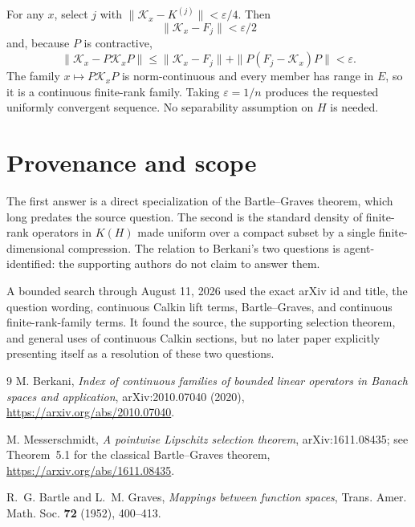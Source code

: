 \documentclass[11pt]{article}
\begin{document}
For any $x$, select $j$ with
$\|\mathcal K_x-K^{(j)}\|<\varepsilon/4$.  Then
\[
 \|\mathcal K_x-F_j\|<\varepsilon/2
\]
and, because $P$ is contractive,
\[
 \|\mathcal K_x-P\mathcal K_xP\|
 \leq \|\mathcal K_x-F_j\|+
       \|P(F_j-\mathcal K_x)P\|
 <\varepsilon.
\]
The family $x\mapsto P\mathcal K_xP$ is norm-continuous and every member has
range in $E$, so it is a continuous finite-rank family.  Taking
$\varepsilon=1/n$ produces the requested uniformly convergent sequence.  No
separability assumption on $H$ is needed.

\section*{Provenance and scope}
The first answer is a direct specialization of the Bartle--Graves theorem,
which long predates the source question.  The second is the standard density
of finite-rank operators in $K(H)$ made uniform over a compact subset by a
single finite-dimensional compression.  The relation to Berkani's two
questions is agent-identified: the supporting authors do not claim to answer
them.

A bounded search through August 11, 2026 used the exact arXiv id and title,
the question wording, continuous Calkin lift terms, Bartle--Graves, and
continuous finite-rank-family terms.  It found the source, the supporting
selection theorem, and general uses of continuous Calkin sections, but no
later paper explicitly presenting itself as a resolution of these two
questions.

\begin{thebibliography}{9}
M. Berkani,
\emph{Index of continuous families of bounded linear operators in Banach spaces and application},
arXiv:2010.07040 (2020),
\url{https://arxiv.org/abs/2010.07040}.

M. Messerschmidt,
\emph{A pointwise Lipschitz selection theorem},
arXiv:1611.08435; see Theorem~5.1 for the classical Bartle--Graves theorem,
\url{https://arxiv.org/abs/1611.08435}.

R.~G. Bartle and L.~M. Graves,
\emph{Mappings between function spaces},
Trans. Amer. Math. Soc. \textbf{72} (1952), 400--413.
\end{thebibliography}
\end{document}
